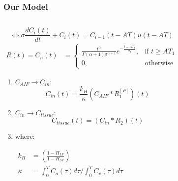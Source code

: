 %

\begin{frame}
  \frametitle{Our Model}
    \begin{columns}
        \begin{block}{}
        \begin{equation}
            \Leftrightarrow \sigma \frac{dC_{i}(t)}{dt} + C_{i}(t) = C_{i-1}(t-AT) u(t-AT)
        \end{equation}
        \begin{equation}  
            \begin{aligned}
                R(t) = C_n(t) &= {\left\{
                \begin{array}{ll}
                \frac{t^\alpha}{\Gamma(\alpha+1)\sigma^{\alpha+1}} e^{-\frac{t - AT_1}{\sigma_1}}, & \text{if } t \geq AT_1 \\
                0, & \text{otherwise}
                \end{array}
                \right.}
            \end{aligned}
        \end{equation}
        \vspace{-13pt}
        \begin{enumerate}
            \item $C_{AIF} \rightarrow C_{in}$:
            \begin{equation}
                C_{in}(t) = \frac{k_H}{\kappa} \left( C_{AIF} * R_{1}^{[P]} \right)(t)
            \end{equation}
            \item $C_{in} \rightarrow C_{tissue}$:
            \begin{equation}
            C_{tissue}(t) = \left( C_{in} * R_{2} \right)(t)
            \end{equation}

            \item[] where:
            
            $\begin{aligned}
                k_H &= \left(\frac{1 - H_{LV}}{1 - H_{SV}}\right) \\
                \kappa &= \int_0^T C_a(\tau) d\tau / \int_0^T C_v(\tau) d\tau
            \end{aligned}$    
            
        \end{enumerate}
        \end{block}


\end{columns}
\end{frame}
